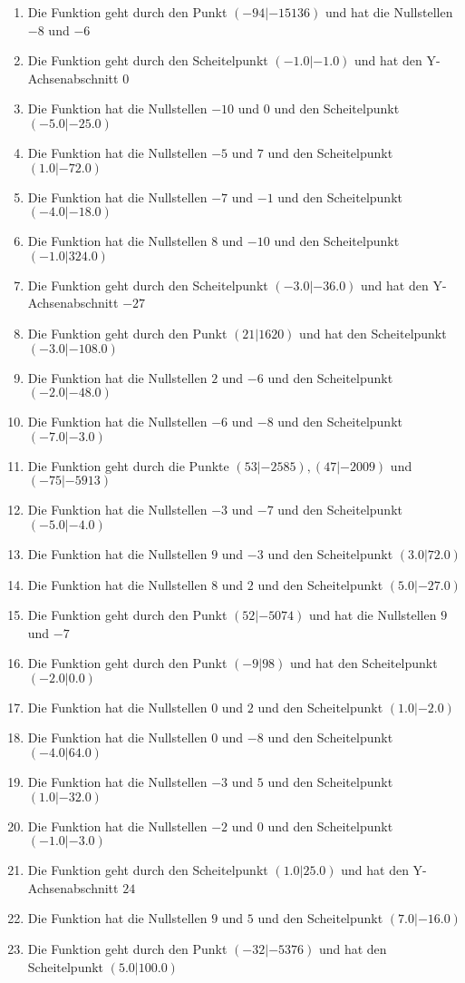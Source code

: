 \documentclass{article}%
\begin{document}
\begin{enumerate}[label=\alph*)]
\item%
 Die Funktion geht durch den Punkt $(-94|-15136)$ und hat die Nullstellen $-8$ und $-6$%
\item%
 Die Funktion geht durch den Scheitelpunkt $(-1.0|-1.0)$ und hat den Y-Achsenabschnitt $0$%
\item%
 Die Funktion hat die Nullstellen $-10$ und $0$ und den Scheitelpunkt $(-5.0|-25.0)$%
\item%
 Die Funktion hat die Nullstellen $-5$ und $7$ und den Scheitelpunkt $(1.0|-72.0)$%
\item%
 Die Funktion hat die Nullstellen $-7$ und $-1$ und den Scheitelpunkt $(-4.0|-18.0)$%
\item%
 Die Funktion hat die Nullstellen $8$ und $-10$ und den Scheitelpunkt $(-1.0|324.0)$%
\item%
 Die Funktion geht durch den Scheitelpunkt $(-3.0|-36.0)$ und hat den Y-Achsenabschnitt $-27$%
\item%
 Die Funktion geht durch den Punkt $(21|1620)$ und hat den Scheitelpunkt $(-3.0|-108.0)$%
\item%
 Die Funktion hat die Nullstellen $2$ und $-6$ und den Scheitelpunkt $(-2.0|-48.0)$%
\item%
 Die Funktion hat die Nullstellen $-6$ und $-8$ und den Scheitelpunkt $(-7.0|-3.0)$%
\item%
 Die Funktion geht durch die Punkte $(53|-2585),(47|-2009)$ und $(-75|-5913)$%
\item%
 Die Funktion hat die Nullstellen $-3$ und $-7$ und den Scheitelpunkt $(-5.0|-4.0)$%
\item%
 Die Funktion hat die Nullstellen $9$ und $-3$ und den Scheitelpunkt $(3.0|72.0)$%
\item%
 Die Funktion hat die Nullstellen $8$ und $2$ und den Scheitelpunkt $(5.0|-27.0)$%
\item%
 Die Funktion geht durch den Punkt $(52|-5074)$ und hat die Nullstellen $9$ und $-7$%
\item%
 Die Funktion geht durch den Punkt $(-9|98)$ und hat den Scheitelpunkt $(-2.0|0.0)$%
\item%
 Die Funktion hat die Nullstellen $0$ und $2$ und den Scheitelpunkt $(1.0|-2.0)$%
\item%
 Die Funktion hat die Nullstellen $0$ und $-8$ und den Scheitelpunkt $(-4.0|64.0)$%
\item%
 Die Funktion hat die Nullstellen $-3$ und $5$ und den Scheitelpunkt $(1.0|-32.0)$%
\item%
 Die Funktion hat die Nullstellen $-2$ und $0$ und den Scheitelpunkt $(-1.0|-3.0)$%
\item%
 Die Funktion geht durch den Scheitelpunkt $(1.0|25.0)$ und hat den Y-Achsenabschnitt $24$%
\item%
 Die Funktion hat die Nullstellen $9$ und $5$ und den Scheitelpunkt $(7.0|-16.0)$%
\item%
 Die Funktion geht durch den Punkt $(-32|-5376)$ und hat den Scheitelpunkt $(5.0|100.0)$%
\end{enumerate}

%
\end{document}
